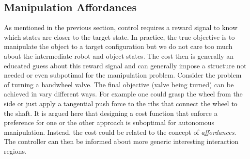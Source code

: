 \subsection{Manipulation Affordances}
As mentioned in the previous section, control requires a reward signal to know which states are closer to the target state. In practice, the true objective is to manipulate the object to a target configuration but we do not care too much about the intermediate robot and object states. The cost then is generally an educated guess about this reward signal and can generally impose a structure not needed or even subpotimal for the manipulation problem. Consider the problem of turning a handwheel valve. The final objective (valve being turned) can be achieved in vary different ways. For example one could grasp the wheel from the side or just apply a tangential push force to the ribs that connect the wheel to the shaft. It is argued here that designing a cost function that enforce a preference for one or the other approach is suboptimal for autonomous manipulation. Instead, the cost could be related to the concept of \emph{affordances}. The controller can then be informed about more generic interesting interaction regions.

